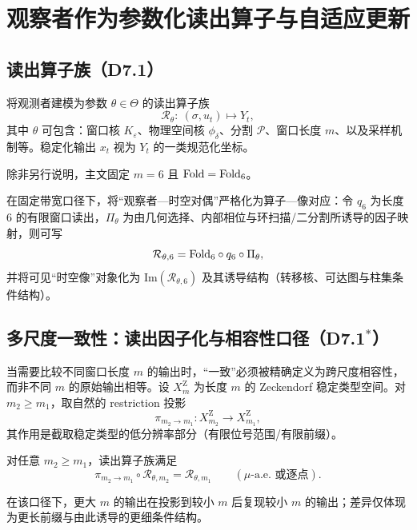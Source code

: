 \section{观察者作为参数化读出算子与自适应更新}

\subsection{读出算子族（D7.1）}

将观测者建模为参数 $\theta\in\Theta$ 的读出算子族
\[
\mathcal{R}_{\theta}:\ (\sigma,u_t)\mapsto Y_t,
\]
其中 $\theta$ 可包含：窗口核 $K_{\varepsilon}$、物理空间核 $\phi_{\delta}$、分割 $\mathcal{P}$、窗口长度 $m$、以及采样机制等。稳定化输出 $x_t$ 视为 $Y_t$ 的一类规范化坐标。

\begin{assumption}[主文固定带宽]\label{assump:m6-fixed-framework}
除非另行说明，主文固定 $m=6$ 且 $\mathrm{Fold}=\mathrm{Fold}_6$。
\end{assumption}

在固定带宽口径下，将“观察者—时空对偶”严格化为算子—像对应：令 $q_6$ 为长度 $6$ 的有限窗口读出，$\Pi_{\theta}$ 为由几何选择、内部相位与环扫描/二分割所诱导的因子映射，则可写
$$
\mathcal{R}_{\theta,6}=\mathrm{Fold}_6\circ q_6\circ \Pi_{\theta},
$$
并将可见“时空像”对象化为 $\mathrm{Im}(\mathcal{R}_{\theta,6})$ 及其诱导结构（转移核、可达图与柱集条件结构）。

\subsection{多尺度一致性：读出因子化与相容性口径（D7.1$^\ast$）}

当需要比较不同窗口长度 $m$ 的输出时，“一致”必须被精确定义为跨尺度相容性，而非不同 $m$ 的原始输出相等。设 $X_m^{\mathrm Z}$ 为长度 $m$ 的 Zeckendorf 稳定类型空间。对 $m_2\ge m_1$，取自然的 restriction 投影
\[
\pi_{m_2\to m_1}:X_{m_2}^{\mathrm Z}\to X_{m_1}^{\mathrm Z},
\]
其作用是截取稳定类型的低分辨率部分（有限位号范围/有限前缀）。

\begin{assumption}\label{assump:framework-scale-factorization}
对任意 $m_2\ge m_1$，读出算子族满足
\[
\pi_{m_2\to m_1}\circ \mathcal{R}_{\theta,m_2}=\mathcal{R}_{\theta,m_1}\qquad (\mu\text{-a.e. 或逐点}).
\]
\end{assumption}

在该口径下，更大 $m$ 的输出在投影到较小 $m$ 后复现较小 $m$ 的输出；差异仅体现为更长前缀与由此诱导的更细条件结构。

